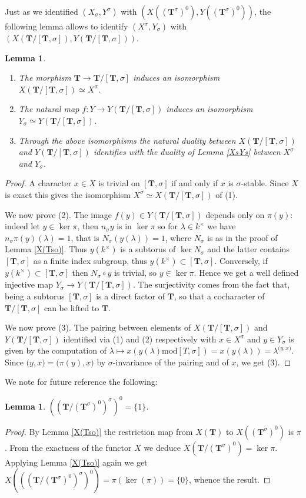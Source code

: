 \documentclass{amsart}
\newtheorem{lemma}[equation]{Lemma}
\numberwithin{equation}{section}
\theoremstyle{definition}
\theoremstyle{remark}
\newcommand\bT{{\mathbf T}}
\newcommand\Tso{{(\bT^\sigma)^0}}
\newcommand\LT{{\bT/[\bT,\sigma]}}
\newcommand\pairing[2]{{\mathopen(#1,#2\mathclose)}}
\begin{document}
Just as we identified $(X_\sigma,Y^\sigma)$ with $(X(\Tso),Y(\Tso))$, the 
following lemma allows to identify $(X^\sigma,Y_\sigma)$ with
$(X(\LT),Y(\LT))$.
\begin{lemma}\label{X(T/LT)}~
\begin{enumerate}
\item The morphism $\bT\to\LT$ induces an isomorphism $X(\LT)\simeq X^\sigma$.
\item
The natural map $f:Y\to Y(\LT)$ 
induces an isomorphism $Y_\sigma\simeq Y(\LT)$.
\item Through the above isomorphisms
the natural duality between $X(\LT)$ and $Y(\LT)$ identifies
with the duality of Lemma \ref{XsYs} between $X^\sigma$ and $Y_\sigma$.
\end{enumerate}
\end{lemma}
\begin{proof}
A character $x\in X$ is trivial on $[\bT,\sigma]$ if and
only if $x$ is $\sigma$-stable. Since $X$ is exact this gives
the isomorphism $X^\sigma\simeq X(\LT)$ of (1).

We  now prove (2).
The   image  $f(y)\in  Y(\LT)$   depends  only  on   $\pi(y)$:  indeed  let
$y\in\ker\pi$,  then $n_\sigma y$ is  in $\ker\pi$ so  for $\lambda\in k^\times$ we
have   $n_\sigma \pi(y)(\lambda)=1$,   that   is   $N_\sigma(y(\lambda))=1$, 
where $N_\sigma$ is as in the proof of Lemma \ref{X(Tso)}.
Thus $y(k^\times)$  is a  subtorus of $\ker
N_\sigma$  and  the  latter  contains  $[\bT,\sigma]$  as  a  finite  index
subgroup, thus   $y(k^\times)\subset[\bT,\sigma]$.   Conversely,   if
$y(k^\times)\subset[\bT,\sigma]$  then  $N_\sigma\circ  y$  is  trivial, so
$y\in\ker\pi$.  Hence  we  get  a  well  defined injective map $Y_\sigma\to
Y(\LT)$.  The  surjectivity  comes  from  the  fact that, being a subtorus $[\bT,\sigma]$
is a direct factor of $\bT$, so that a cocharacter of $\LT$ can be
lifted to $\bT$.

We  now prove (3). The pairing  between elements of $X(\LT)$ and
$Y(\LT)$  identified via (1) and (2)  respectively with $x\in X^\sigma$ and
$y\in   Y_\sigma$   is   given   by   the  computation  of  $\lambda\mapsto
x(y(\lambda)\text{mod}  [T,\sigma])= x(y(\lambda))=\lambda^{\pairing yx}$.
Since  $\pairing yx=\pairing{\pi(y)}x$  by
$\sigma$-invariance of the pairing and of $x$, we get (3).
\end{proof}
We note for future reference the following:
\begin{lemma}
$((\bT/\Tso)^\sigma)^0=\{1\}$.
\end{lemma}
\begin{proof}
By Lemma \ref{X(Tso)} the restriction map from $X(\bT)$ to $X(\Tso)$ is $\pi$. 
From the exactness of the functor $X$ we deduce $X(\bT/\Tso)=\ker\pi$. 
Applying Lemma \ref{X(Tso)} again we get 
$X(((\bT/\Tso)^\sigma)^0)=\pi(\ker(\pi))=\{0\}$, whence the result.
\end{proof}
\end{document}
